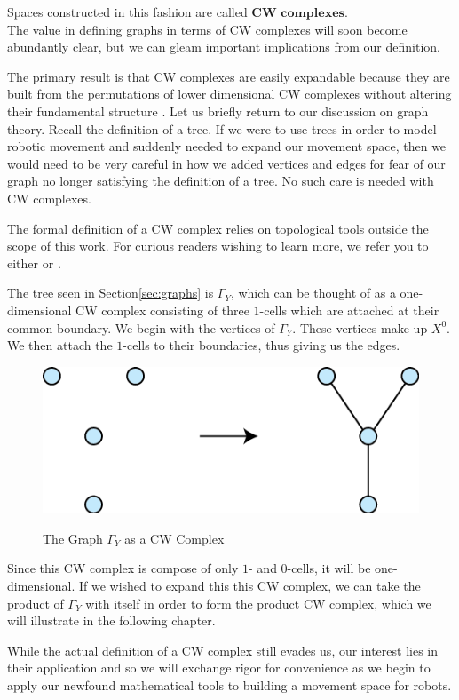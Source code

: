 \documentclass[12pt,oneside]{amsbook}
\newcommand{\Y}{\Gamma_Y}
\begin{document}
Spaces constructed in this fashion are called $\textbf{CW complexes}$\cite{at}. \\

The value in defining graphs in terms of CW complexes will soon become abundantly clear, but we can gleam important implications from our definition. 

The primary result is that CW complexes are easily expandable because they are built from the permutations of lower dimensional CW complexes without altering their fundamental structure \cite{cw}. Let us briefly return to our discussion on graph theory. Recall the definition of a tree. If we were to use trees in order to model robotic movement and suddenly needed to expand our movement space, then we would need to be very careful in how we added vertices and edges for fear of our graph no longer satisfying the definition of a tree. No such care is needed with CW complexes.

The formal definition of a CW complex relies on topological tools outside the scope of this work. For curious readers wishing to learn more, we refer you to either \cite{at} or \cite{cw}.

The tree seen in Section\ref{sec:graphs} is $\Y$, which can be thought of as a one-dimensional CW complex consisting of three $1$-cells which are attached at their common boundary. We begin with the vertices of $\Y$. These vertices make up $X^0$. We then attach the $1$-cells to their boundaries, thus giving us the edges.

\begin{figure}[h]
\centering
\caption{The Graph $\Y$ as a CW Complex}
\includegraphics[scale=.75]{CW_Y}
\label{fig:cw_y}
\end{figure}

Since this CW complex is compose of only $1$- and $0$-cells, it will be one-dimensional. If we wished to expand this this CW complex, we can take the product of $\Y$ with itself in order to form the product CW complex, which we will illustrate in the following chapter.

While the actual definition of a CW complex still evades us, our interest lies in their application and so we will exchange rigor for convenience as we begin to apply our newfound mathematical tools to building a movement space for robots.
\end{document}
